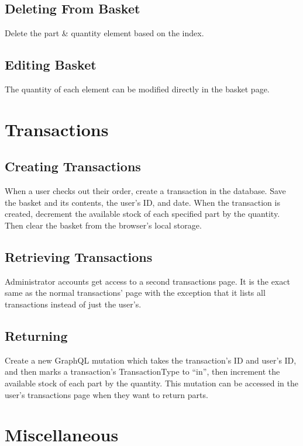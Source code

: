 \documentclass[12pt, letterpaper]{article}
\begin{document}
\subsection{Deleting From Basket}

Delete the part \& quantity element based on the index.

\subsection{Editing Basket}

The quantity of each element can be modified directly in the basket page.

\section{Transactions}

\subsection{Creating Transactions}

When a user checks out their order, create a transaction in the database. Save the basket and its contents, the user's ID, and date. When the transaction is created, decrement the available stock of each specified part by the quantity. Then clear the basket from the browser's local storage.

\subsection{Retrieving Transactions}

Administrator accounts get access to a second transactions page. It is the exact same as the normal transactions' page with the exception that it lists all transactions instead of just the user's.

\subsection{Returning}

Create a new GraphQL mutation which takes the transaction's ID and user's ID, and then marks a transaction's TransactionType to ``in'', then increment the available stock of each part by the quantity. This mutation can be accessed in the user's transactions page when they want to return parts.

\section{Miscellaneous}
\end{document}
